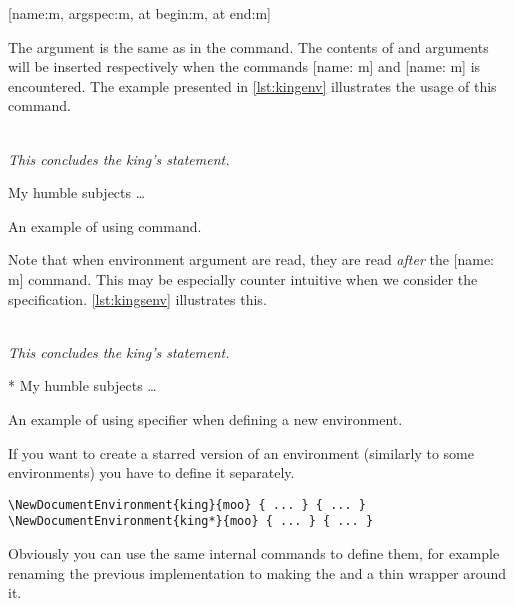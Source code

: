 \begin{lscommand}
  \small
  [name:m, argspec:m, at begin:m, at end:m]
\end{lscommand}
The  argument is the same as in the
 command. The contents of  and  arguments will be inserted respectively when the commands
[name: m] and [name: m] is encountered. The example
presented in \autoref{lst:kingenv} illustrates the usage of this command.
\begin{listing}
  \begin{example}
 {%
  \\[1em]%
  \emph{This concludes
    the king's statement.}%
}

\begin{king}
My humble subjects \ldots
\end{king}
\end{example}
  \caption{An example of using 
    command.}\label{lst:kingenv}
\end{listing}

Note that when environment argument are read, they are read \emph{after} the
[name: m] command. This may be especially counter intuitive when we
consider the  specification. \autoref{lst:kingsenv} illustrates this.
\begin{listing}
  \begin{example}
 {%
  \\[1em]%
  \emph{This concludes
    the king's statement.}%
}

\begin{king}*
My humble subjects \ldots
\end{king}
\end{example}
  \caption{An example of using  specifier when defining a new
    environment.}\label{lst:kingsenv}
\end{listing}
If you want to create a starred version of an environment (similarly to some
 environments) you have to define it separately.
\begin{verbatim}
\NewDocumentEnvironment{king}{moo} { ... } { ... }
\NewDocumentEnvironment{king*}{moo} { ... } { ... }
\end{verbatim}
Obviously you can use the same internal commands to define them, for example
renaming the previous implementation to  making the
 and  a thin wrapper around it.

